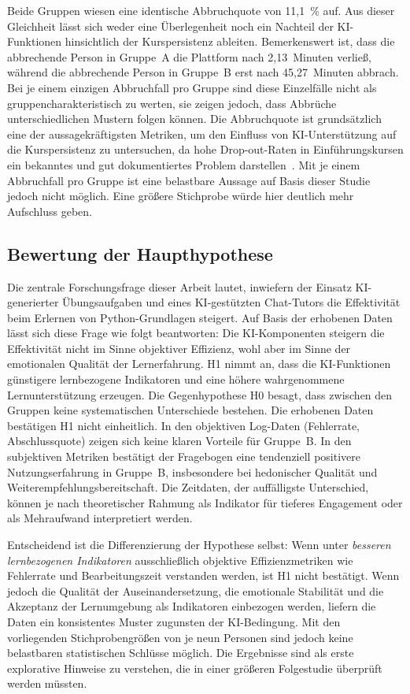 Beide Gruppen wiesen eine identische Abbruchquote von 11{,}1~\% auf. Aus dieser Gleichheit lässt sich weder eine Überlegenheit noch ein Nachteil der KI-Funktionen hinsichtlich der Kurspersistenz ableiten. Bemerkenswert ist, dass die abbrechende Person in Gruppe~A die Plattform nach 2{,}13~Minuten verließ, während die abbrechende Person in Gruppe~B erst nach 45{,}27~Minuten abbrach. Bei je einem einzigen Abbruchfall pro Gruppe sind diese Einzelfälle nicht als gruppencharakteristisch zu werten, sie zeigen jedoch, dass Abbrüche unterschiedlichen Mustern folgen können. Die Abbruchquote ist grundsätzlich eine der aussagekräftigsten Metriken, um den Einfluss von KI-Unterstützung auf die Kurspersistenz zu untersuchen, da hohe Drop-out-Raten in Einführungskursen ein bekanntes und gut dokumentiertes Problem darstellen~\cite{bennedsen2007}. Mit je einem Abbruchfall pro Gruppe ist eine belastbare Aussage auf Basis dieser Studie jedoch nicht möglich. Eine größere Stichprobe würde hier deutlich mehr Aufschluss geben.

\subsection{Bewertung der Haupthypothese}\label{subsec:diskussion_hypothese}

Die zentrale Forschungsfrage dieser Arbeit lautet, inwiefern der Einsatz KI-generierter Übungsaufgaben und eines KI-gestützten Chat-Tutors die Effektivität beim Erlernen von Python-Grundla\-gen steigert. 
Auf Basis der erhobenen Daten lässt sich diese Frage wie folgt beantworten: Die KI-Komponenten steigern die Effektivität nicht im Sinne objektiver Effizienz, wohl aber im Sinne der emotionalen Qualität der Lernerfahrung. 
H1 nimmt an, dass die KI-Funktionen günstigere lernbezogene Indikatoren und eine höhere wahrgenommene Lernunterstützung erzeugen. Die Gegenhypothese H0 besagt, dass zwischen den Gruppen keine systematischen Unterschiede bestehen. 
Die erhobenen Daten bestätigen H1 nicht einheitlich. In den objektiven Log-Daten (Fehlerrate, Abschlussquote) zeigen sich keine klaren Vorteile für Gruppe~B. In den subjektiven Metriken bestätigt der Fragebogen eine tendenziell positivere Nutzungserfahrung in Gruppe~B, insbesondere bei hedonischer Qualität und Weiterempfehlungsbereitschaft. Die Zeitdaten, der auffälligste Unterschied, können je nach theoretischer Rahmung als Indikator für tieferes Engagement oder als Mehraufwand interpretiert werden.

Entscheidend ist die Differenzierung der Hypothese selbst: Wenn unter \textit{besseren lernbezogenen Indikatoren} ausschließlich objektive Effizienzmetriken wie Fehlerrate und Bearbeitungszeit verstanden werden, ist H1 nicht bestätigt. Wenn jedoch die Qualität der Auseinandersetzung, die emotionale Stabilität und die Akzeptanz der Lernumgebung als Indikatoren einbezogen werden, liefern die Daten ein konsistentes Muster zugunsten der KI-Bedingung. Mit den vorliegenden Stichprobengrößen von je neun Personen sind jedoch keine belastbaren statistischen Schlüsse möglich. Die Ergebnisse sind als erste explorative Hinweise zu verstehen, die in einer größeren Folgestudie überprüft werden müssten.


